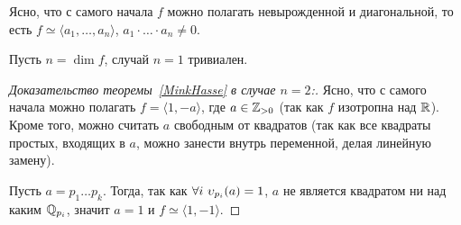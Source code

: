 	\begin{remark}
		Ясно, что с самого начала $f$ можно полагать невырожденной и диагональной, то есть $f \simeq \langle a_1, \ldots, a_n \rangle$, $a_1 \cdot \ldots \cdot a_n \neq 0$.
	\end{remark}

	Пусть $n = \dim{f}$, случай $n = 1$ тривиален. 

	\begin{proof}[Доказательство теоремы~\ref{MinkHasse} в случае $n = 2$:]
		Ясно, что с самого начала можно полагать $f = \langle 1, -a \rangle$, где $a \in \mathbb{Z}_{>0}$ (так как $f$ изотропна над $\mathbb{R}$). Кроме того, можно считать $a$ свободным от квадратов (так как все квадраты простых, входящих в $a$, можно занести внутрь переменной, делая линейную замену).

		 Пусть $a = p_1 \ldots p_k$. Тогда, так как $\forall i \ \upsilon_{p_i}(a) = 1$, $a$ не является квадратом ни над каким $\mathbb{Q}_{p_i}$, значит $a = 1$ и $f \simeq \langle 1, - 1\rangle$.
	\end{proof}
